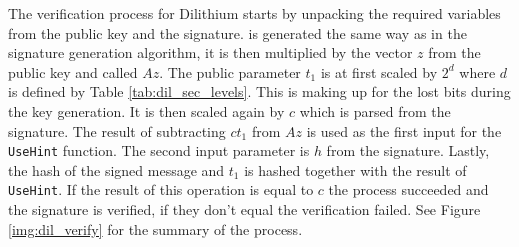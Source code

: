 The verification process for Dilithium starts by unpacking the required variables from the public key and the signature.  is generated the same way as in the signature generation algorithm, it is then multiplied by the vector $z$ from the public key and called $Az$. The public parameter $t_1$ is at first scaled by $2^d$ where $d$ is defined by Table \ref{tab:dil_sec_levels}. This is making up for the lost bits during the key generation. It is then scaled again by $c$ which is parsed from the signature. The result of subtracting $ct_1$ from $Az$ is used as the first input for the \texttt{UseHint} function. The second input parameter is $h$ from the signature. Lastly, the hash of the signed message and $t_1$ is hashed together with the result of \texttt{UseHint}. If the result of this operation is equal to $c$ the process succeeded and the signature is verified, if they don't equal the verification failed. See Figure \ref{img:dil_verify} for the summary of the process.
\clearpage
{}
